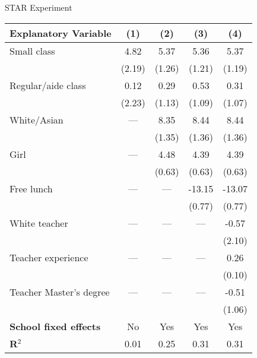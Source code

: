 \documentclass{clbeamer2024}
\begin{document}
\begin{frame}{STAR Experiment}
    \begin{table}[h!]
        \centering
        \footnotesize
        \begin{tabular}{lcccc}
            \hline
            \textbf{Explanatory Variable} & \textbf{(1)} & \textbf{(2)} & \textbf{(3)} & \textbf{(4)} \\
            \hline
            Small class                   & 4.82        & 5.37        & 5.36        & 5.37        \\
                                          & (2.19)      & (1.26)      & (1.21)      & (1.19)      \\
            Regular/aide class            & 0.12        & 0.29        & 0.53        & 0.31        \\
                                          & (2.23)      & (1.13)      & (1.09)      & (1.07)      \\
            White/Asian                   & —           & 8.35        & 8.44        & 8.44        \\
                                          &             & (1.35)      & (1.36)      & (1.36)      \\
            Girl                          & —           & 4.48        & 4.39        & 4.39        \\
                                          &             & (0.63)      & (0.63)      & (0.63)      \\
            Free lunch                    & —           & —           & -13.15      & -13.07      \\
                                          &             &             & (0.77)      & (0.77)      \\
            White teacher                 & —           & —           & —           & -0.57       \\
                                          &             &             &             & (2.10)      \\
            Teacher experience            & —           & —           & —           & 0.26        \\
                                          &             &             &             & (0.10)      \\
            Teacher Master's degree       & —           & —           & —           & -0.51       \\
                                          &             &             &             & (1.06)      \\
            \hline
            \textbf{School fixed effects} & No          & Yes         & Yes         & Yes         \\
            \textbf{R$^2$}                & 0.01        & 0.25        & 0.31        & 0.31        \\
            \hline
        \end{tabular}
    \end{table}
\end{frame}
\end{document}
